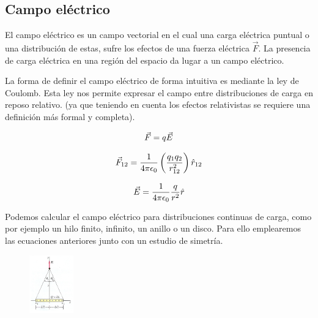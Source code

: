 \documentclass[11pt]{article}
\begin{document}
\subsection{Campo eléctrico}
    El campo eléctrico es un campo vectorial en el cual una carga eléctrica puntual o una distribución de estas, sufre los efectos de una fuerza eléctrica $\Vec{F}$. La presencia de carga eléctrica en una región del espacio da lugar a un campo eléctrico.
    
    \vspace{0.4cm}La forma de definir el campo eléctrico de forma intuitiva es mediante la ley de Coulomb. Esta ley nos permite expresar el campo entre distribuciones de carga en reposo relativo. (ya que teniendo en cuenta los efectos relativistas se requiere una definición más formal y completa).

    \begin{equation}
        \centering
        \vec{F}=q\vec{E}
        \label{Ec:F=qE}
    \end{equation}
    
    \begin{equation}
        \centering
        \vec{F}_{12}=\frac{1}{4\pi\epsilon_{0}} \left (\frac{q_{1}q_{2}}{r_{12}^{2}}\right )\hat{r}_{12} 
        \label{Ec:F}
    \end{equation}

    \begin{equation}
            \centering
            \vec{E}=\frac{1}{4\pi\epsilon_{0}}\frac{q}{r^{2}}\hat{r}
            \label{Ec:E}
        \end{equation}

    Podemos calcular el campo eléctrico para distribuciones continuas de carga, como por ejemplo un hilo finito, infinito, un anillo o un disco. Para ello emplearemos las ecuaciones anteriores junto con un estudio de simetría.

    \begin{figure}
        \vspace{-0.65cm}
        \centering
        \includegraphics[width=0.17\textwidth]{Captura3.PNG}
    \end{figure} 
\end{document}
